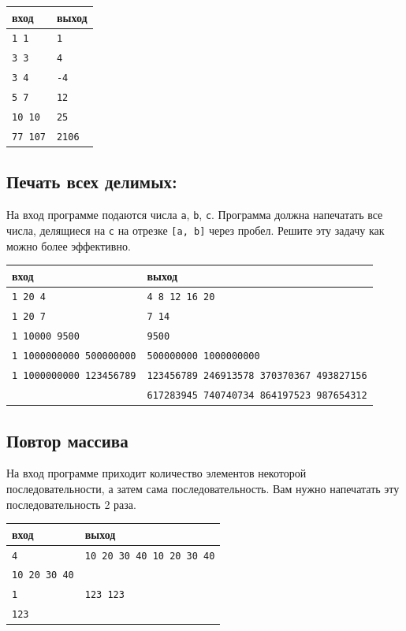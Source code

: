 \documentclass[10pt]{article}
\begin{document}
\begin{center}
\begin{tabular}{ l l }
 вход & выход \\ \hline
 \texttt{1 1}  & \texttt{1}  \\ 
 \texttt{3 3} & \texttt{4}  \\ 
 \texttt{3 4} & \texttt{-4}  \\  
 \texttt{5 7} & \texttt{12}  \\  
 \texttt{10 10} & \texttt{25}  \\  
 \texttt{77 107} & \texttt{2106}  \\ 
\end{tabular}
\end{center}


\subsection{Печать всех делимых:}
На вход программе подаются числа \texttt{a}, \texttt{b}, \texttt{c}. Программа должна напечатать все числа, делящиеся на \texttt{c} на отрезке \texttt{[a, b]} через пробел. Решите эту задачу как можно более эффективно.

\begin{center}
\begin{tabular}{ l l }
 вход & выход \\ \hline
 \texttt{1 20 4}  & \texttt{4 8 12 16 20}  \\ 
 \texttt{1 20 7} &  \texttt{7 14}  \\ 
 \texttt{1 10000 9500} & \texttt{9500}  \\ 
 \texttt{1 1000000000 500000000} & \texttt{500000000 1000000000} \\
 \texttt{1 1000000000 123456789} & \texttt{123456789 246913578 370370367 493827156}  \\ 
                                 & \texttt{617283945 740740734 864197523 987654312}  \\   
\end{tabular}
\end{center}


\subsection{Повтор массива}
На вход программе приходит количество элементов некоторой последовательности, а затем сама последовательность. Вам нужно напечатать эту последовательность 2 раза.

\begin{center}
\begin{tabular}{ l | l }
 вход & выход \\ \hline
 \texttt{4} & \texttt{10 20 30 40 10 20 30 40}  \\  
 \texttt{10 20 30 40} &  \\ \hline
 \texttt{1} & \texttt{123 123}  \\  
 \texttt{123} &  \\ 
\end{tabular}
\end{center}
\end{document}
